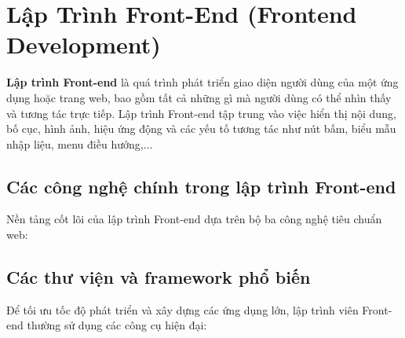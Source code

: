 \documentclass[11pt,oneside]{book}
\newcommand{\thd}[1]{\textcolor{white}{\textbf{\strut #1}}}
\newcommand{\term}[1]{\textbf{\textcolor{primaryBlue}{#1}}}
\begin{document}
\section{Lập Trình Front-End (Frontend Development)}
\label{sec:frontend_dev}

\term{Lập trình Front-end} là quá trình phát triển giao diện người dùng của một ứng dụng hoặc trang web, bao gồm tất cả những gì mà người dùng có thể nhìn thấy và tương tác trực tiếp. Lập trình Front-end tập trung vào việc hiển thị nội dung, bố cục, hình ảnh, hiệu ứng động và các yếu tố tương tác như nút bấm, biểu mẫu nhập liệu, menu điều hướng,...

\subsection{Các công nghệ chính trong lập trình Front-end}

Nền tảng cốt lõi của lập trình Front-end dựa trên bộ ba công nghệ tiêu chuẩn web:

\begin{prettyTableBox}
\end{prettyTableBox}

\subsection{Các thư viện và framework phổ biến}

Để tối ưu tốc độ phát triển và xây dựng các ứng dụng lớn, lập trình viên Front-end thường sử dụng các công cụ hiện đại:
\end{document}
